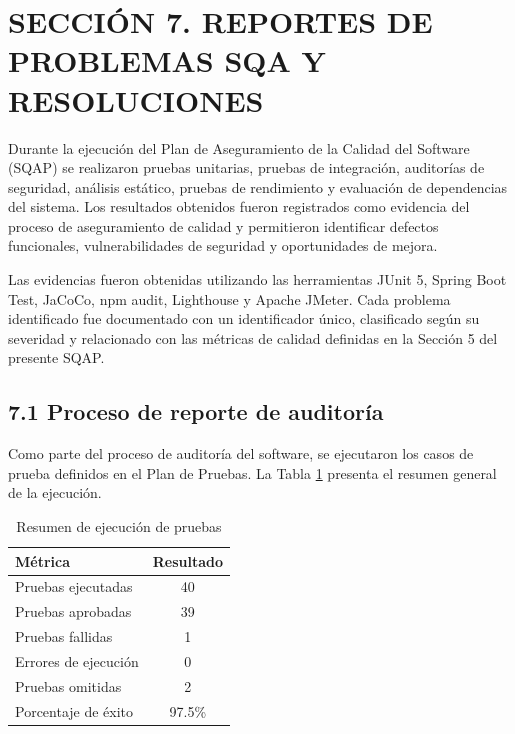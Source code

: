 ﻿\section{SECCIÓN 7. REPORTES DE PROBLEMAS SQA Y RESOLUCIONES}

Durante la ejecución del Plan de Aseguramiento de la Calidad del Software (SQAP) se realizaron pruebas unitarias, pruebas de integración, auditorías de seguridad, análisis estático, pruebas de rendimiento y evaluación de dependencias del sistema. Los resultados obtenidos fueron registrados como evidencia del proceso de aseguramiento de calidad y permitieron identificar defectos funcionales, vulnerabilidades de seguridad y oportunidades de mejora.

Las evidencias fueron obtenidas utilizando las herramientas JUnit 5, Spring Boot Test, JaCoCo, npm audit, Lighthouse y Apache JMeter. Cada problema identificado fue documentado con un identificador único, clasificado según su severidad y relacionado con las métricas de calidad definidas en la Sección 5 del presente SQAP.

\subsection{7.1 Proceso de reporte de auditoría}

Como parte del proceso de auditoría del software, se ejecutaron los casos de prueba definidos en el Plan de Pruebas. La Tabla \ref{tab:ejecucion} presenta el resumen general de la ejecución.

\begin{table}[H]
    \centering
    \begin{tabular}{|l|c|}
        \hline
        \textbf{Métrica}     & \textbf{Resultado} \\
        \hline
        Pruebas ejecutadas   & 40                 \\
        Pruebas aprobadas    & 39                 \\
        Pruebas fallidas     & 1                  \\
        Errores de ejecución & 0                  \\
        Pruebas omitidas     & 2                  \\
        Porcentaje de éxito  & 97.5\%             \\
        \hline
    \end{tabular}
    \caption{Resumen de ejecución de pruebas}
    \label{tab:ejecucion}
\end{table}

